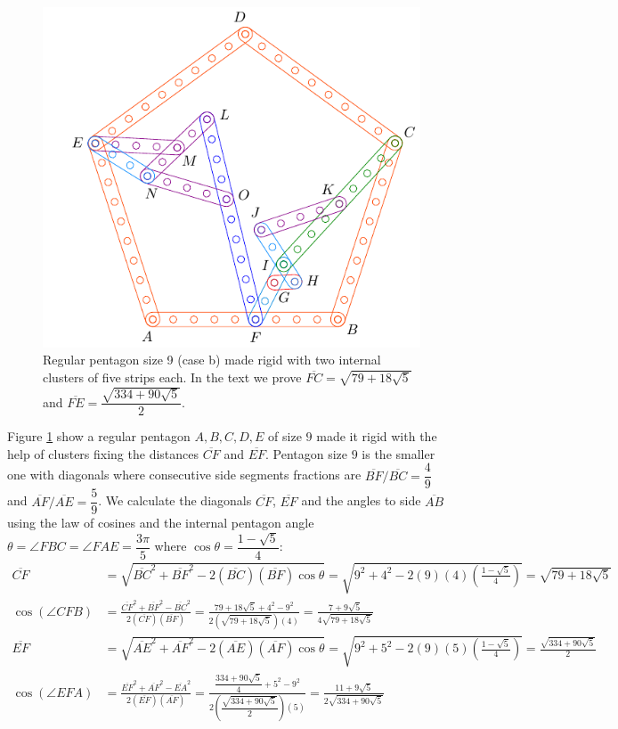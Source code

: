 \documentclass[11pt]{article}
\begin{document}
\begin{figure}[H]
 \centering
 \includegraphics[scale=0.9]{9/penta9b}
 \caption{Regular pentagon size 9 (case b) made rigid with two internal clusters of five strips each. In the text we prove $\overline{FC}=\sqrt{79 + 18\sqrt5}$ and $\overline{FE} = \dfrac{\sqrt{334 + 90\sqrt5}}2$.}
 \label{fig:penta9b}
\end{figure}

Figure \ref{fig:penta9b} show a regular pentagon $A,B,C,D,E$ of size $9$ made it rigid with the help of clusters fixing the distances $\overline{CF}$ and $\overline{EF}$. Pentagon size $9$ is the smaller one with diagonals where consecutive side segments fractions are $\overline{BF} / \overline{BC} =\dfrac{4}9$ and $\overline{AF} / \overline{AE} = \dfrac{5}9$. We calculate the diagonals $\overline{CF}$, $\overline{EF}$ and the angles to side $\overline{AB}$ using the law of cosines and the internal pentagon angle $\theta=\angle{FBC}=\angle{FAE}=\dfrac{3\pi}5$ where $\cos\theta = \dfrac{1-\sqrt5}4$:
\begin{align}
\overline{CF} &= \sqrt{
 \overline{BC}^2 + \overline{BF}^2 - 2(\overline{BC})(\overline{BF})\cos\theta } 
 = \sqrt{9^2 + 4^2 - 2(9)(4)\left(\frac{1-\sqrt5}4\right)} = \sqrt{79 + 18\sqrt5}\\
%
\cos(\angle{CFB}) &= 
 \frac{\overline{CF}^2 + \overline{BF}^2 - \overline{BC}^2}{2(\overline{CF})(\overline{BF})}
 = \frac{79 + 18\sqrt5 + 4^2 - 9^2}{2(\sqrt{79 + 18\sqrt5})(4)}
 = \frac{7 + 9\sqrt5}{4\sqrt{79 + 18\sqrt5}} \\
%
\overline{EF} &= \sqrt{
 \overline{AE}^2 + \overline{AF}^2 - 2(\overline{AE})(\overline{AF})\cos\theta} 
 = \sqrt{9^2 + 5^2 - 2(9)(5)\left(\frac{1-\sqrt5}4\right)} = \frac{\sqrt{334 + 90\sqrt5}}2\\
%
\cos(\angle{EFA}) &=
 \frac{\overline{EF}^2 + \overline{AF}^2 - \overline{EA}^2}{2(\overline{EF})(\overline{AF})}
 = \frac{\dfrac{334 + 90\sqrt5}4 + 5^2 - 9^2 }{2\left(\dfrac{\sqrt{334 + 90\sqrt5}}2\right)(5)}
 = \frac{11 + 9\sqrt5}{2\sqrt{334 + 90\sqrt5}}
\end{align}
\end{document}
